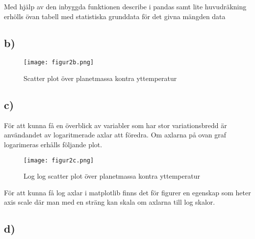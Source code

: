 \documentclass[a4paper]{article}
\begin{document}
Med hjälp av den inbyggda funktionen describe i pandas samt lite huvudräkning erhölls övan tabell med statistiska grunddata för det givna mängden data

\subsection{b)}

\begin{figure}[H]
    \begin{small}
        \begin{center}
            \texttt{[image: figur2b.png]}
        \end{center}
        \caption{Scatter plot över planetmassa kontra yttemperatur}
        \label{fig:2b}
    \end{small}
\end{figure}


\subsection{c)}

För att kunna få en överblick av variabler som har stor variationsbredd är användandet av logaritmerade axlar att föredra. Om axlarna på ovan graf logarimeras erhålls följande plot. 

\begin{figure}[H]
    \begin{small}
        \begin{center}
            \texttt{[image: figur2c.png]}
        \end{center}
        \caption{Log log scatter plot över planetmassa kontra yttemperatur}
        \label{fig:2c}
    \end{small}
\end{figure}

För att kunna få log axlar i matplotlib finns det för figurer en egenskap som heter axis scale där man med en sträng kan skala om axlarna till log skalor.

\subsection{d)}
\end{document}

